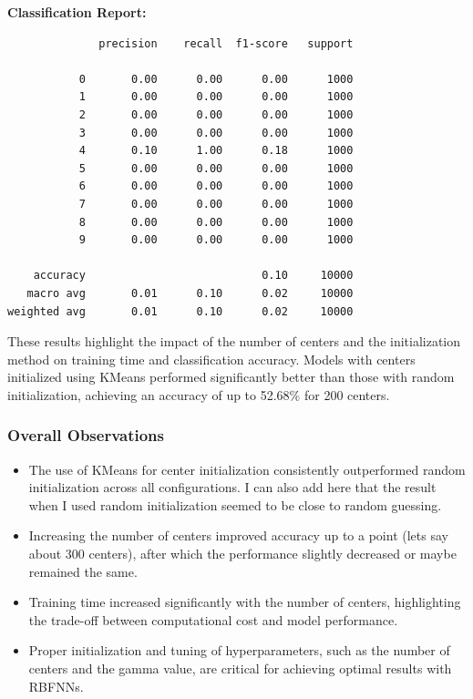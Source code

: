 \documentclass[lettersize,journal]{IEEEtran}
\begin{document}
\textbf{Classification Report:}
\begin{scriptsize}
\begin{verbatim}
              precision    recall  f1-score   support

           0       0.00      0.00      0.00      1000
           1       0.00      0.00      0.00      1000
           2       0.00      0.00      0.00      1000
           3       0.00      0.00      0.00      1000
           4       0.10      1.00      0.18      1000
           5       0.00      0.00      0.00      1000
           6       0.00      0.00      0.00      1000
           7       0.00      0.00      0.00      1000
           8       0.00      0.00      0.00      1000
           9       0.00      0.00      0.00      1000

    accuracy                           0.10     10000
   macro avg       0.01      0.10      0.02     10000
weighted avg       0.01      0.10      0.02     10000
\end{verbatim}
\end{scriptsize}
These results highlight the impact of the number of centers and the initialization method on training time and classification accuracy. Models with centers initialized using KMeans performed significantly better than those with random initialization, achieving an accuracy of up to 52.68\% for 200 centers.

\subsubsection{\textbf{Overall Observations}}
\begin{itemize}
    \item The use of KMeans for center initialization consistently outperformed random initialization across all configurations. I can also add here that the result when I used random initialization seemed to be close to random guessing.
    \item Increasing the number of centers improved accuracy up to a point (lets say about 300 centers), after which the performance slightly decreased or maybe remained the same.
    \item Training time increased significantly with the number of centers, highlighting the trade-off between computational cost and model performance.
    \item Proper initialization and tuning of hyperparameters, such as the number of centers and the gamma value, are critical for achieving optimal results with RBFNNs.
\end{itemize}
\end{document}
